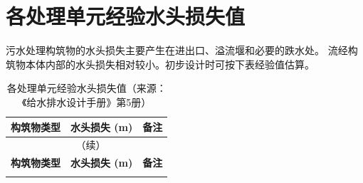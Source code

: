 \documentclass[12pt,a4paper]{ctexart}
\begin{document}
\section{各处理单元经验水头损失值}

污水处理构筑物的水头损失主要产生在进出口、溢流堰和必要的跌水处。
流经构筑物本体内部的水头损失相对较小。初步设计时可按下表经验值估算。

\begin{longtable}{@{}lll@{}}
\caption{各处理单元经验水头损失值（来源：《给水排水设计手册》第5册）} \\
\toprule
\textbf{构筑物类型} & \textbf{水头损失 (m)} & \textbf{备注} \\
\midrule
\endfirsthead
\multicolumn{3}{c}{\tablename\ \thetable{} （续）} \\
\toprule
\textbf{构筑物类型} & \textbf{水头损失 (m)} & \textbf{备注} \\
\midrule
\endhead
\bottomrule
\endfoot


\end{longtable}
\end{document}
